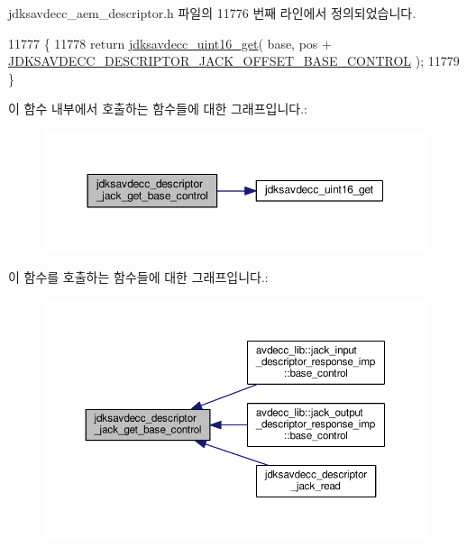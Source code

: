 jdksavdecc\+\_\+aem\+\_\+descriptor.\+h 파일의 11776 번째 라인에서 정의되었습니다.


\begin{DoxyCode}
11777 \{
11778     \textcolor{keywordflow}{return} \hyperlink{group__endian_ga3fbbbc20be954aa61e039872965b0dc9}{jdksavdecc\_uint16\_get}( base, pos + 
      \hyperlink{group__descriptor__jack_gabe7a66f364508baf1dbad52069d37f33}{JDKSAVDECC\_DESCRIPTOR\_JACK\_OFFSET\_BASE\_CONTROL} );
11779 \}
\end{DoxyCode}


이 함수 내부에서 호출하는 함수들에 대한 그래프입니다.\+:
\nopagebreak
\begin{figure}[H]
\begin{center}
\leavevmode
\includegraphics[width=350pt]{group__descriptor__jack_ga66e6cd48fd68493c3b3ac954c69dfec4_cgraph}
\end{center}
\end{figure}




이 함수를 호출하는 함수들에 대한 그래프입니다.\+:
\nopagebreak
\begin{figure}[H]
\begin{center}
\leavevmode
\includegraphics[width=350pt]{group__descriptor__jack_ga66e6cd48fd68493c3b3ac954c69dfec4_icgraph}
\end{center}
\end{figure}


